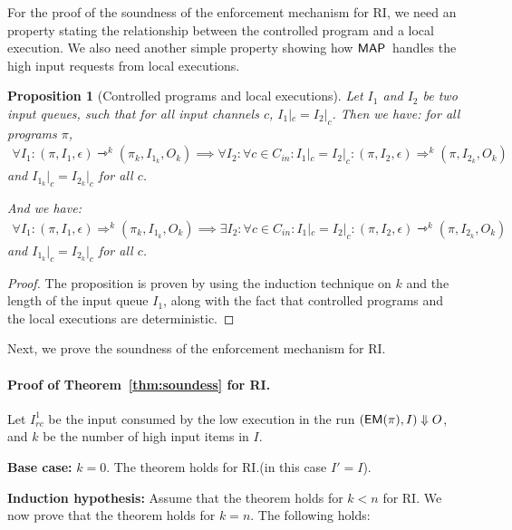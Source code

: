 \documentclass[10pt,a4paper,oneside]{article}
\newtheorem{proposition}{Proposition}[section]
\def\execution#1#2#3{\ensuremath{(#1, #2)\Downarrow#3}}
\def\Irc#1{\ensuremath{I_{rc}^{#1}}}
\def\channeleq#1#2#3{\ensuremath{\restrict{#1}{#3} = \restrict{#2}{#3}}}
\def\restrict#1#2{\ensuremath{{#1}|_{#2}}}
\def\chnl{\ensuremath{c}}
\def\Cin{\ensuremath{C_{in}}}
\def\sanserif#1{\ensuremath{\sf #1}}
\def\MAP{\ensuremath{\sanserif{MAP}}}
\def\emptyQ{\ensuremath{\epsilon}}
\def\EM{\ensuremath{{\sanserif{EM}}}}
\def\Prog{\ensuremath{\pi}}
\def\EMP{\ensuremath{\EM(}\ensuremath{\Prog)}}
\begin{document}
For the proof of the soundness of the enforcement mechanism for RI, we need an  property stating the relationship between the controlled program and a local execution. We also need another simple property showing how \MAP\ handles the high input requests from local executions.

\begin{proposition}[Controlled programs and local executions] \label{prop:semantics-eq} Let $I_1$ and $I_2$ be two input queues, such that for all input channels \chnl, $I_1|_{\chnl} = I_2|_{\chnl}$. Then we have: for all programs \Prog,
\begin{multline*}
\forall I_1: (\Prog, I_1, \emptyQ) \rightarrowtriangle^k (\Prog_k, I_{1_k}, O_k) \implies \forall I_2:\forall \chnl \in \Cin: I_1|_{\chnl} = I_2|_{\chnl}: (\Prog, I_2,\emptyQ) \Rightarrow^k (\Prog, I_{2_k}, O_k)
\end{multline*} and $\channeleq{I_{1_k}}{I_{2_k}}{\chnl}$ for all \chnl.

And we have:
\begin{multline*}
\forall I_1: (\Prog, I_1,\emptyQ) \Rightarrow^k (\Prog_k, I_{1_k}, O_k) \implies \exists I_2:\forall \chnl \in \Cin: I_1|_{\chnl} = I_2|_{\chnl}: (\Prog, I_2,\emptyQ) \rightarrowtriangle^k (\Prog, I_{2_k}, O_k)
\end{multline*} and \channeleq{I_{1_k}}{I_{2_k}}{\chnl} for all \chnl.
\end{proposition}

\begin{proof}
The proposition is proven by using the induction technique on $k$ and the length of the input queue $I_1$, along with the fact that controlled programs and the local executions are deterministic.
\end{proof}





Next, we prove the soundness of the enforcement mechanism for RI.
\paragraph{Proof of Theorem~\ref{thm:soundess} for RI.}
Let \Irc{1} be the input consumed by the low execution in the run \execution{\EMP}{I}{O}, and $k$ be the number of high input items in $I$.

\textbf{Base case:} $k = 0$. The theorem holds for RI.(in this case $I' = I$).

\textbf{Induction hypothesis:} Assume that the theorem holds for $k < n$ for RI. We now prove that the theorem holds for $k = n$. The following holds:
\end{document}
